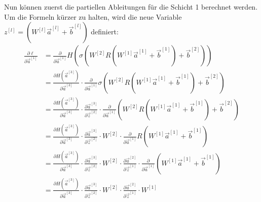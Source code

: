 \documentclass[12pt,titlepage]{article}
\begin{document}
Nun können zuerst die partiellen Ableitungen für die Schicht 1 berechnet werden. Um die Formeln kürzer zu halten, wird die neue Variable \(z^{[l]} = (W^{[l]} \vec{a}^{[l]} + \vec{b}^{[l]})\) definiert:
\begin{align*}
  \frac{\partial \ell}{\partial \vec{a}^{[1]}}
   & = \frac{\partial}{\partial \vec{a}^{[1]}} H(\sigma(W^{[2]} R(W^{[1]} \vec{a}^{[1]} + \vec{b}^{[1]}) + \vec{b}^{[2]}))                                                                                                                                                                  \\
   & = \frac{\partial H(\vec{a}^{[3]})}{\partial \vec{a}^{[3]}} \cdot \frac{\partial}{\partial \vec{a}^{[1]}} \sigma(W^{[2]} R(W^{[1]} \vec{a}^{[1]} + \vec{b}^{[1]}) + \vec{b}^{[2]})                                                                                                      \\
   & = \frac{\partial H(\vec{a}^{[3]})}{\partial \vec{a}^{[3]}} \cdot \frac{\partial \vec{a}^{[3]}}{\partial \vec{z}^{[2]}} \cdot \frac{\partial}{\partial \vec{a}^{[1]}} (W^{[2]} R(W^{[1]} \vec{a}^{[1]} + \vec{b}^{[1]}) + \vec{b}^{[2]})                                                \\
   & = \frac{\partial H(\vec{a}^{[3]})}{\partial \vec{a}^{[3]}} \cdot \frac{\partial \vec{a}^{[3]}}{\partial \vec{z}^{[2]}} \cdot W^{[2]} \cdot \frac{\partial}{\partial \vec{a}^{[1]}} R(W^{[1]} \vec{a}^{[1]} + \vec{b}^{[1]})                                                            \\
   & = \frac{\partial H(\vec{a}^{[3]})}{\partial \vec{a}^{[3]}} \cdot \frac{\partial \vec{a}^{[3]}}{\partial \vec{z}^{[2]}} \cdot W^{[2]} \cdot \frac{\partial \vec{a}^{[2]}}{\partial \vec{z}^{[1]}} \cdot \frac{\partial}{\partial \vec{a}^{[1]}} (W^{[1]} \vec{a}^{[1]} + \vec{b}^{[1]}) \\
   & = \frac{\partial H(\vec{a}^{[3]})}{\partial \vec{a}^{[3]}} \cdot \frac{\partial \vec{a}^{[3]}}{\partial \vec{z}^{[2]}} \cdot W^{[2]} \cdot \frac{\partial \vec{a}^{[2]}}{\partial \vec{z}^{[1]}} \cdot W^{[1]}
\end{align*}
\end{document}
